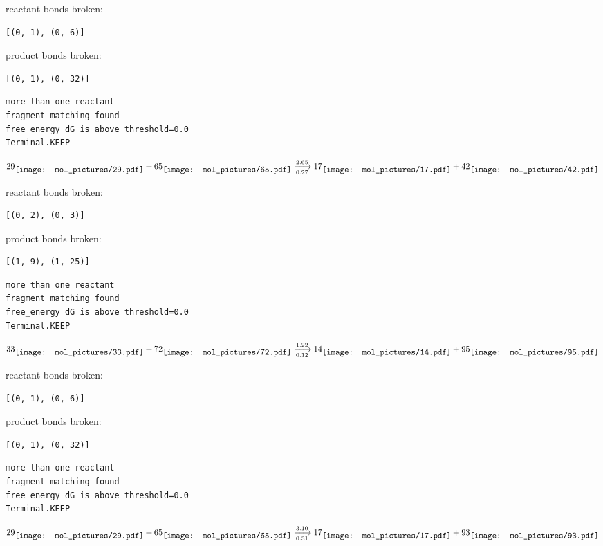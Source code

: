 \documentclass{article}
\begin{document}
reactant bonds broken:\begin{verbatim}
[(0, 1), (0, 6)]
\end{verbatim}
product bonds broken:\begin{verbatim}
[(0, 1), (0, 32)]
\end{verbatim}




\vspace{1cm}
\begin{verbatim}
more than one reactant
fragment matching found
free_energy dG is above threshold=0.0
Terminal.KEEP
\end{verbatim}
$$
29
\raisebox{-.5\height}{\texttt{[image: mol\_pictures/29.pdf]}}
+
65
\raisebox{-.5\height}{\texttt{[image: mol\_pictures/65.pdf]}}
\xrightarrow[0.27]{2.65}
17
\raisebox{-.5\height}{\texttt{[image: mol\_pictures/17.pdf]}}
+
42
\raisebox{-.5\height}{\texttt{[image: mol\_pictures/42.pdf]}}
$$


reactant bonds broken:\begin{verbatim}
[(0, 2), (0, 3)]
\end{verbatim}
product bonds broken:\begin{verbatim}
[(1, 9), (1, 25)]
\end{verbatim}




\vspace{1cm}
\begin{verbatim}
more than one reactant
fragment matching found
free_energy dG is above threshold=0.0
Terminal.KEEP
\end{verbatim}
$$
33
\raisebox{-.5\height}{\texttt{[image: mol\_pictures/33.pdf]}}
+
72
\raisebox{-.5\height}{\texttt{[image: mol\_pictures/72.pdf]}}
\xrightarrow[0.12]{1.22}
14
\raisebox{-.5\height}{\texttt{[image: mol\_pictures/14.pdf]}}
+
95
\raisebox{-.5\height}{\texttt{[image: mol\_pictures/95.pdf]}}
$$


reactant bonds broken:\begin{verbatim}
[(0, 1), (0, 6)]
\end{verbatim}
product bonds broken:\begin{verbatim}
[(0, 1), (0, 32)]
\end{verbatim}




\vspace{1cm}
\begin{verbatim}
more than one reactant
fragment matching found
free_energy dG is above threshold=0.0
Terminal.KEEP
\end{verbatim}
$$
29
\raisebox{-.5\height}{\texttt{[image: mol\_pictures/29.pdf]}}
+
65
\raisebox{-.5\height}{\texttt{[image: mol\_pictures/65.pdf]}}
\xrightarrow[0.31]{3.10}
17
\raisebox{-.5\height}{\texttt{[image: mol\_pictures/17.pdf]}}
+
93
\raisebox{-.5\height}{\texttt{[image: mol\_pictures/93.pdf]}}
$$
\end{document}
